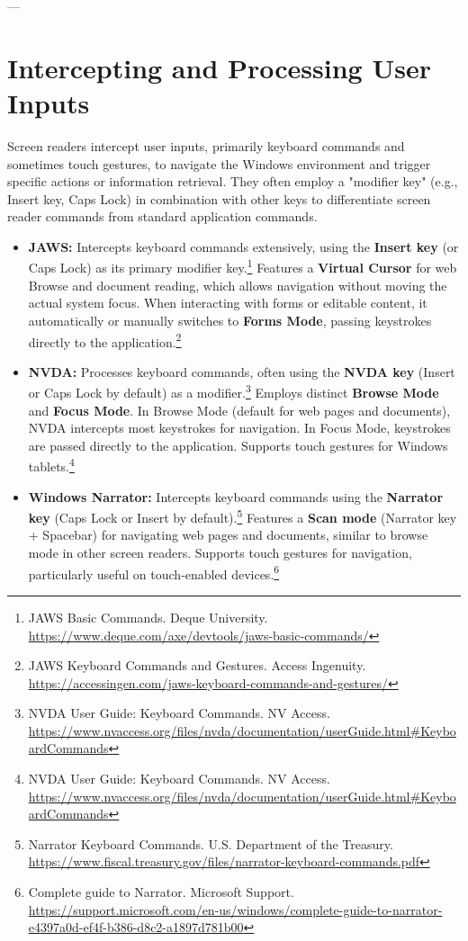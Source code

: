 ---

\section{Intercepting and Processing User Inputs}
\label{sec:intercepting-inputs}

Screen readers intercept user inputs, primarily keyboard commands and sometimes touch gestures, to navigate the Windows environment and trigger specific actions or information retrieval. They often employ a "modifier key" (e.g., Insert key, Caps Lock) in combination with other keys to differentiate screen reader commands from standard application commands.

\begin{itemize}[leftmargin=*,noitemsep,topsep=0pt]
    \item \textbf{JAWS:} Intercepts keyboard commands extensively, using the \textbf{Insert key} (or Caps Lock) as its primary modifier key.\footnote{JAWS Basic Commands. Deque University. \url{https://www.deque.com/axe/devtools/jaws-basic-commands/}} Features a \textbf{Virtual Cursor} for web Browse and document reading, which allows navigation without moving the actual system focus. When interacting with forms or editable content, it automatically or manually switches to \textbf{Forms Mode}, passing keystrokes directly to the application.\footnote{JAWS Keyboard Commands and Gestures. Access Ingenuity. \url{https://accessingen.com/jaws-keyboard-commands-and-gestures/}}
    \item \textbf{NVDA:} Processes keyboard commands, often using the \textbf{NVDA key} (Insert or Caps Lock by default) as a modifier.\footnote{NVDA User Guide: Keyboard Commands. NV Access. \url{https://www.nvaccess.org/files/nvda/documentation/userGuide.html#KeyboardCommands}} Employs distinct \textbf{Browse Mode} and \textbf{Focus Mode}. In Browse Mode (default for web pages and documents), NVDA intercepts most keystrokes for navigation. In Focus Mode, keystrokes are passed directly to the application. Supports touch gestures for Windows tablets.\footnote{NVDA User Guide: Keyboard Commands. NV Access. \url{https://www.nvaccess.org/files/nvda/documentation/userGuide.html#KeyboardCommands}}
    \item \textbf{Windows Narrator:} Intercepts keyboard commands using the \textbf{Narrator key} (Caps Lock or Insert by default).\footnote{Narrator Keyboard Commands. U.S. Department of the Treasury. \url{https://www.fiscal.treasury.gov/files/narrator-keyboard-commands.pdf}} Features a \textbf{Scan mode} (Narrator key + Spacebar) for navigating web pages and documents, similar to browse mode in other screen readers. Supports touch gestures for navigation, particularly useful on touch-enabled devices.\footnote{Complete guide to Narrator. Microsoft Support. \url{https://support.microsoft.com/en-us/windows/complete-guide-to-narrator-e4397a0d-ef4f-b386-d8c2-a1897d781b00}}

\end{itemize}
